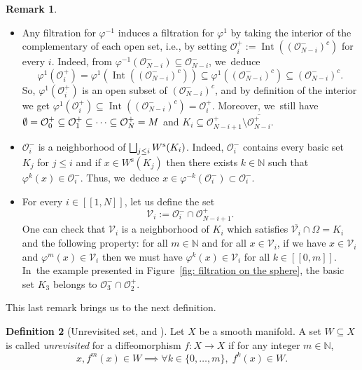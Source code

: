 \documentclass[11pt]{article}
\newcommand{\ie}{i.e.,\xspace}
\newcommand{\skpt}{\smallskip}
\let\oldbigsqcup\bigsqcup
\renewcommand{\bigsqcup}{\mathop{\textstyle\oldbigsqcup}\displaylimits}
\newcommand{\lcr}{[\![}
\newcommand{\rcr}{]\!]}
\newcommand{\rs}{\mathrm{s}}
\theoremstyle{definition}
\newtheorem{definition}{Definition}[section]
\newtheorem{remark}[definition]{Remark}
\theoremstyle{plain}
\newcommand{\N}{\mathbb{N}}
\newcommand{\Ocal}{\mathcal{O}}
\newcommand{\Vcal}{\mathcal{V}}
\DeclareMathOperator{\Int}{Int}
\begin{document}
\skpt
\begin{remark}\label{rk: filtration}
\begin{itemize}
\item Any filtration for $\varphi^{-1}$ induces a filtration for $\varphi^{1}$ by taking the interior of the complementary of each open set, \ie by setting $\Ocal_{i}^{+}:= \Int \left(\left(\Ocal_{N-i}^{-} \right)^c \right)$ for every $i$. Indeed, from $\varphi^{-1} \left(\Ocal_{N-i}^- \right) \subseteq \Ocal_{N-i}^-$, we~deduce
\[
\varphi^1 (\Ocal_{i}^+) = \varphi^1 \left(\Int \left(\left(\Ocal_{N-i}^- \right)^c \right) \right) \subseteq \varphi^1 \left(\left(\Ocal_{N-i}^- \right)^c \right) \subseteq \left(\Ocal_{N-i}^- \right)^c.
\]
So, $\varphi^1 (\Ocal_{i}^+)$ is an open subset of $\left(\Ocal_{N-i}^- \right)^c$, and by definition of the interior we get $\varphi^1 (\Ocal_{i}^+) \subseteq \Int \left(\left(\Ocal_{N-i}^- \right)^c \right) = \Ocal_{i}^+$.
Moreover, we~still have $\emptyset = \Ocal_0^+ \subseteq \Ocal_{1}^+ \subseteq \cdots \subseteq \Ocal_N^+ =\nobreak M$ and $K_{i} \subseteq \Ocal_{N-i+1}^+ \setminus \overline{\Ocal_{N-i}^+}$.
\item $\Ocal_i^- $ is a neighborhood of $\bigsqcup_{j\leq i} W^\rs (K_i)$. Indeed, $\Ocal_i^- $ contains every basic set $K_j$ for $j \leq i$ and if
$x \in W^\rs (K_j)$ then there exists $k \in \N$ such that $\varphi^k (x) \in \Ocal_i^-$. Thus, we~deduce $x \in \varphi^{-k} (\Ocal_i^-) \subset \Ocal_i^-$.
\item For every $i\in\lcr1,N\rcr$, let us define the set
\[
\Vcal_i:= \Ocal_i^- \cap \Ocal_{N-i+1}^+.
\]
One can check that $\Vcal_i$ is a neighborhood of $K_i$ which satisfies $\overline{\Vcal_i}\cap \Omega = K_i$ and the following property: for all $m \in \N$ and for all $x \in \Vcal_i$, if we have $x \in \Vcal_i$ and $\varphi^m (x) \in \Vcal_i$ then we must have $\varphi^k (x) \in \Vcal_i$ for all $k\in\lcr0,m\rcr$. In~the example presented in Figure~\ref{fig: filtration on the sphere}, the basic set $K_3$ belongs to $\Ocal_3^- \cap \Ocal_2^+$.
\end{itemize}
\end{remark}

This last remark brings us to the next definition.

\begin{definition}[{Unrevisited set, \cite[p.\,463]{robbin} and \cite{shub}}]Let $X$ be a smooth manifold. A set $W \subseteq X$ is called \emph{unrevisited} for a diffeomorphism $f: X \to X$ if for any integer $m \in \N$,
\[
x, f^m (x) \in W \implies \forall k \in \{0,\dots,m \},\; f^k (x) \in W.
\]
\end{definition}
\end{document}
